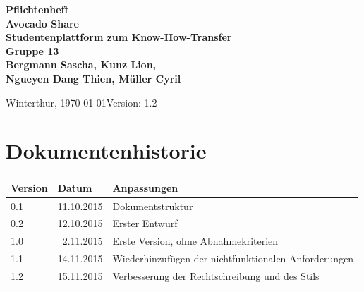 \documentclass{avocado}
\title{\title}
\author{\autorA \and \autorB \and \autorC \and \autorD \and \autorD}
\newcommand{\titel}{Avocado Share}
\newcommand{\doctype}{Pflichtenheft}
\newcommand{\untertitel}{Studentenplattform zum Know-How-Transfer}
\newcommand{\datum}{\today}
\newcommand{\team}{Gruppe 13}
\newcommand{\autorA}{Bergmann Sascha}
\newcommand{\autorB}{Kunz Lion}
\newcommand{\autorC}{Ngueyen Dang Thien}
\newcommand{\autorD}{Müller Cyril}
\newcommand{\ort}{Winterthur}
\newcommand{\dozent}{}
\newcommand{\betreuer}{}
\newcommand{\version}{1.2}
\begin{document}



\thispagestyle{plain}

\begin{titlepage}
    \begin{flushleft}
        \vspace*{1cm}
        \textbf{
            \hspace{-0.12cm}\LARGE{\doctype}\\
            \Huge{\titel}\\
            \vspace{0.5cm}
            \large{\untertitel}\\
            \vspace{1.5cm}
            \large{\team\\\autorA, \autorB,\\\autorC, \autorD}\\
        }
        \vspace{1cm}
        \vfill
        \large{

            \ort, \datum \hfill Version: \version
        }
    \end{flushleft}
\end{titlepage}

\section*{Dokumentenhistorie}
\begin{tabularx}{\linewidth}{|l|r|X|} \hline
Version & \multicolumn{1}{l|}{Datum} 			& Anpassungen \\ \hline
0.1 & 11.10.2015		& Dokumentstruktur \\ \hline
0.2	& 12.10.2015       & Erster Entwurf  \\ \hline
1.0 &  2.11.2015		& Erste Version, ohne Abnahmekriterien \\ \hline
1.1 & 14.11.2015        & Wiederhinzufügen der nichtfunktionalen Anforderungen \\ \hline
1.2 & 15.11.2015        & Verbesserung der Rechtschreibung und des Stils\\ \hline
\end{tabularx}
\vfill
\end{document}
